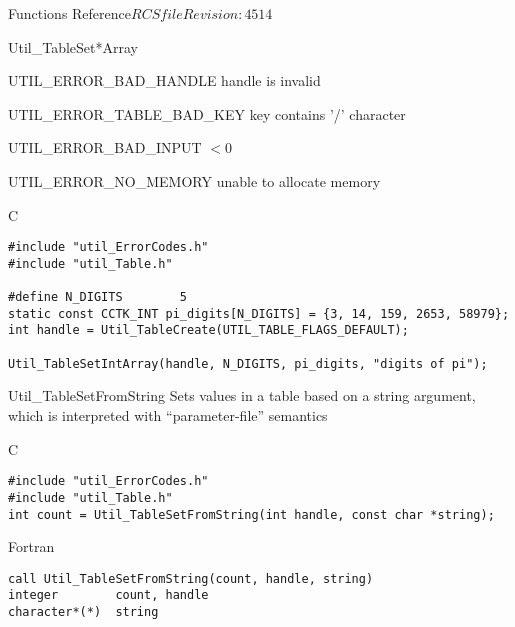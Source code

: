 \begin{cactuspart}{ Functions Reference}{$RCSfile$}{$Revision: 4514 $}
\begin{FunctionDescription}{Util\_TableSet*Array}
\begin{ErrorSection}
\begin{Error}{UTIL\_ERROR\_BAD\_HANDLE}
handle is invalid
\end{Error}
\begin{Error}{UTIL\_ERROR\_TABLE\_BAD\_KEY}
key contains '/' character
\end{Error}
\begin{Error}{UTIL\_ERROR\_BAD\_INPUT}
 $< 0$
\end{Error}
\begin{Error}{UTIL\_ERROR\_NO\_MEMORY}
unable to allocate memory
\end{Error}
\end{ErrorSection}

\begin{ExampleSection}
\begin{Example}{C}
\begin{verbatim}
#include "util_ErrorCodes.h"
#include "util_Table.h"

#define N_DIGITS        5
static const CCTK_INT pi_digits[N_DIGITS] = {3, 14, 159, 2653, 58979};
int handle = Util_TableCreate(UTIL_TABLE_FLAGS_DEFAULT);

Util_TableSetIntArray(handle, N_DIGITS, pi_digits, "digits of pi");
\end{verbatim}
\end{Example}
\end{ExampleSection}
\end{FunctionDescription}


\begin{FunctionDescription}{Util\_TableSetFromString}
\label{Util-TableSetFromString}
Sets values in a table based on a string argument, which is interpreted
with ``parameter-file'' semantics

\begin{SynopsisSection}
\begin{Synopsis}{C}
\begin{verbatim}
#include "util_ErrorCodes.h"
#include "util_Table.h"
int count = Util_TableSetFromString(int handle, const char *string);
\end{verbatim}
\end{Synopsis}
\begin{Synopsis}{Fortran}
\begin{verbatim}
call Util_TableSetFromString(count, handle, string)
integer        count, handle
character*(*)  string
\end{verbatim}
\end{Synopsis}
\end{SynopsisSection}


\end{FunctionDescription}
\end{cactuspart}
